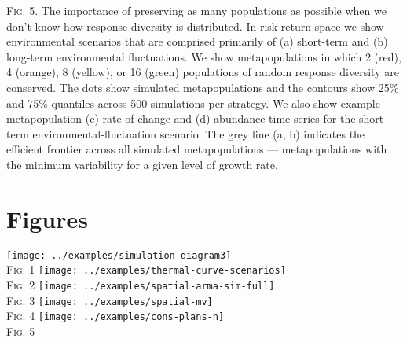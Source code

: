 \documentclass[12pt]{article}
\begin{document}
\begin{spacing}{1.9}

\bigskip
\noindent
\textsc{Fig. 5}. The importance of preserving as many populations as possible when we don't know how response diversity is distributed. In risk-return space we show environmental scenarios that are comprised primarily of (a) short-term and (b) long-term environmental fluctuations. We show metapopulations in which 2 (red), 4 (orange), 8 (yellow), or 16 (green) populations of random response diversity are conserved. The dots show simulated metapopulations and the contours show 25\% and 75\% quantiles across 500 simulations per strategy. We also show example metapopulation (c) rate-of-change and (d) abundance time series for the short-term environmental-fluctuation scenario. The grey line (a, b) indicates the efficient frontier across all simulated metapopulations --- metapopulations with the minimum variability for a given level of growth rate.

\clearpage

\section{Figures}

\begin{center}
\texttt{[image: ../examples/simulation-diagram3]}\\
\textsc{Fig.} 1
\clearpage
\texttt{[image: ../examples/thermal-curve-scenarios]}\\
\textsc{Fig.} 2
\clearpage
\texttt{[image: ../examples/spatial-arma-sim-full]}\\
\textsc{Fig.} 3
\clearpage
\texttt{[image: ../examples/spatial-mv]}\\
\textsc{Fig.} 4
\clearpage
\texttt{[image: ../examples/cons-plans-n]}\\
\textsc{Fig.} 5
\clearpage
\end{center}

\end{spacing}


 \begin{spacing}{1.1}

 \setcounter{page}{1}
 \nolinenumbers
 

 \end{spacing}
\end{document}
